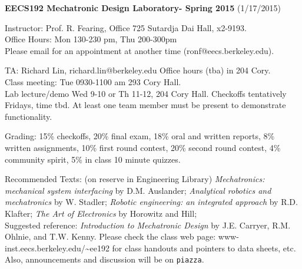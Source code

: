 \documentclass[10pt]{article}
\begin{document}
{\Large \bf EECS192 Mechatronic Design Laboratory- Spring 2015}
(1/17/2015)

Instructor: Prof. R. Fearing, Office 725 Sutardja Dai Hall, x2-9193.
\\
Office Hours: Mon 130-230 pm, Thu 200-300pm \\
Please email for an appointment at another time (ronf@eecs.berkeley.edu).

TA: Richard Lin,  richard.lin@berkeley.edu Office hours (tba) in 204 Cory.\\
Class meeting: Tue 0930-1100 am 293 Cory Hall.\\
Lab lecture/demo Wed 9-10 or Th 11-12, 204 Cory Hall.
Checkoffs tentatively Fridays, time tbd. At least one team member must
be present to demonstrate functionality.

Grading: 15\% checkoffs, 20\% final exam, 18\% oral and written reports, 
8\% written assignments, 10\% first round contest, 
20\% second round contest,  4\% community spirit, 5\% in class 10 minute 
quizzes.

Recommended Texts: (on reserve in Engineering Library)
{\em Mechatronics: mechanical system interfacing} by D.M. Auslander;
{\em Analytical robotics and mechatronics} by W. Stadler;
{\em Robotic engineering: an integrated approach} by R.D. Klafter;
{\em The Art of Electronics} by Horowitz and Hill;
\\
Suggested reference: {\em Introduction to Mechatronic Design} 
by J.E. Carryer, R.M. Ohlnie, and T.W. Kenny.
Please check the class web page: www-inst.eecs.berkeley.edu/\~{}ee192
for class handouts and pointers to data sheets, etc. Also, announcements
and discussion will be on {\tt piazza}.
\\
\end{document}
